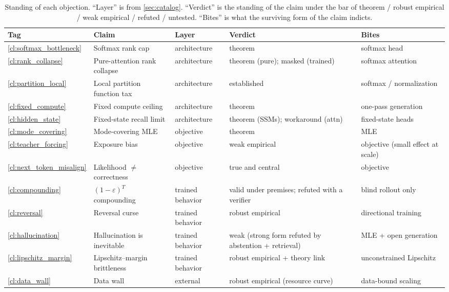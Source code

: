\begin{table}[ht]
  \centering
  \small
  \caption{Standing of each objection.
  ``Layer'' is from \cref{sec:catalog}.
  ``Verdict'' is the standing of the claim under the bar of theorem / robust empirical / weak empirical / refuted / untested.
  ``Bites'' is what the surviving form of the claim indicts.}
  \label{tab:verdicts}
  \begin{tabular}{@{}lllll@{}}
    \toprule
    Tag & Claim & Layer & Verdict & Bites \\
    \midrule
    \ref{cl:softmax_bottleneck}  & Softmax rank cap                     & architecture     & theorem            & softmax head \\
    \ref{cl:rank_collapse}       & Pure-attention rank collapse         & architecture     & theorem (pure); masked (trained) & softmax attention \\
    \ref{cl:partition_local}     & Local partition function tax         & architecture     & established        & softmax / normalization \\
    \ref{cl:fixed_compute}       & Fixed compute ceiling                & architecture     & theorem            & one-pass generation \\
    \ref{cl:hidden_state}        & Fixed-state recall limit             & architecture     & theorem (SSMs); workaround (attn) & fixed-state heads \\
    \ref{cl:mode_covering}       & Mode-covering MLE                    & objective        & theorem            & MLE \\
    \ref{cl:teacher_forcing}     & Exposure bias                        & objective        & weak empirical     & objective (small effect at scale) \\
    \ref{cl:next_token_misalign} & Likelihood $\neq$ correctness        & objective        & true and central   & objective \\
    \ref{cl:compounding}         & $(1-\varepsilon)^T$ compounding      & trained behavior & valid under premises; refuted with a verifier & blind rollout only \\
    \ref{cl:reversal}            & Reversal curse                       & trained behavior & robust empirical   & directional training \\
    \ref{cl:hallucination}       & Hallucination is inevitable          & trained behavior & weak (strong form refuted by abstention + retrieval) & MLE + open generation \\
    \ref{cl:lipschitz_margin}    & Lipschitz--margin brittleness        & trained behavior & robust empirical + theory link & unconstrained Lipschitz \\
    \ref{cl:data_wall}           & Data wall                            & external         & robust empirical (resource curve) & data-bound scaling \\
    \bottomrule
  \end{tabular}
\end{table}

